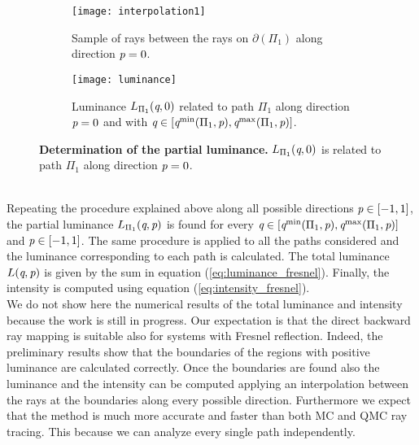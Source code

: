 \begin{figure}[t]
\centering
\begin{subfigure}{.45\textwidth}
  \texttt{[image: interpolation1]}
 \caption{Sample of rays between the rays on $\partial$$(\Pi_1)$ along direction $\textit{p}=0$.}
  \label{fig:interpolation1}
\end{subfigure}%
\hfill
\begin{subfigure}{.45\textwidth}
  \texttt{[image: luminance]}
  \caption{Luminance $L_{\Pi_1}(\textit{q}, 0)$ related to path $\Pi_1$ along direction $\textit{p}=0$ and with $\textit{q}\in[\textit{q}^{\textrm{min}}(\Pi_1, \textit{p}), \textit{q}^{\textrm{max}}(\Pi_1, \textit{p})]$.} %
  \label{fig:luminance_fresnel}
\end{subfigure} %
\caption{\textbf{Determination of the partial luminance.} $L_{\Pi_1}(\textit{q}, 0)$ is related to path $\Pi_1$ along direction $\textit{p}=0$.} 
\end{figure}
\\\indent 
Repeating the procedure explained above along all possible directions $\textit{p}\in[-1,1]$, the partial luminance $L_{\Pi_1}(\textit{q}, \textit{p})$ is found for every $\textit{q}\in[\textit{q}^{\textrm{min}}(\Pi_1,\textit{p}), \textit{q}^{\textrm{max}}(\Pi_1,\textit{p})]$ and $\textit{p}\in[-1,1]$. The same procedure is applied to all the paths considered and the luminance corresponding to each path is calculated. The total luminance $L(\textit{q}, \textit{p})$ is given by the sum in equation (\ref{eq:luminance_fresnel}). Finally, the intensity is computed using equation (\ref{eq:intensity_fresnel}). \\ \indent
We do not show here the numerical results of the total luminance and intensity because the work is still in progress. Our expectation is that the direct backward ray mapping is suitable also for systems with Fresnel reflection. Indeed, the preliminary results show that the boundaries of the regions with positive luminance are calculated correctly. Once the boundaries are found also the luminance and the intensity can be computed applying an interpolation between the rays at the boundaries along every possible direction. Furthermore we expect that the method is much more accurate and faster than both MC and QMC ray tracing. This because we can analyze every single path independently.  
